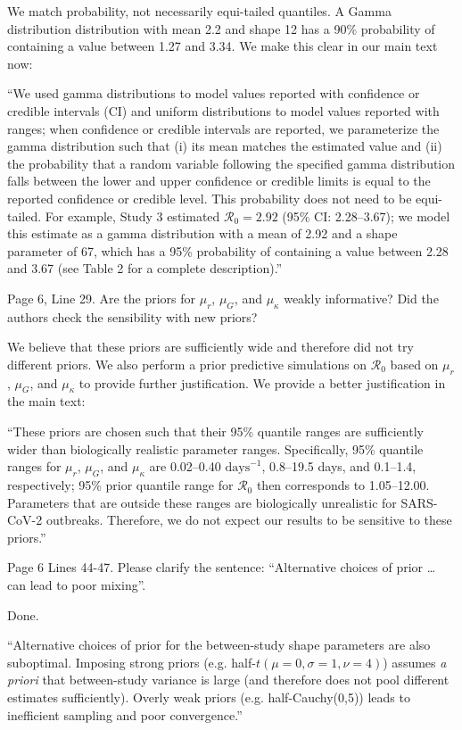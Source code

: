 \documentclass[12pt]{article}
\newcommand{\Ro}{\ensuremath{{\mathcal R}_{0}}\xspace}
\newcommand{\revtext}{\textsf}
\begin{document}
We match probability, not necessarily equi-tailed quantiles. A Gamma distribution distribution with mean
2.2 and shape 12 has a 90\% probability of containing a value between 1.27 and 3.34. We make this clear in our main text now:

``We used gamma distributions to model values reported with confidence or credible intervals (CI) and uniform distributions to model values reported with ranges;
when confidence or credible intervals are reported, we parameterize the gamma distribution such that (i) its mean matches the estimated value and (ii) the probability that a random variable following the specified gamma distribution falls between the lower and upper confidence or credible limits is equal to the reported confidence or credible level. 
This probability does not need to be equi-tailed.
For example, Study 3 estimated $\Ro = 2.92$ (95\% CI: 2.28--3.67);
we model this estimate as a gamma distribution with a mean of 2.92 and a shape parameter of 67, which has a 95\% probability of containing a value between 2.28 and 3.67 (see Table 2 for a complete description).''

\revtext{Page 6, Line 29. Are the priors for $\mu_r$, $\mu_G$, and $\mu_\kappa$ weakly informative? Did the
authors check the sensibility with new priors?}

We believe that these priors are sufficiently wide and therefore did not try different priors.
We also perform a prior predictive simulations on \Ro based on $\mu_r$, $\mu_G$, and $\mu_\kappa$ to provide further justification.
We provide a better justification in the main text:

``These priors are chosen such that their 95\% quantile ranges are sufficiently wider than biologically realistic parameter ranges.
Specifically, 95\% quantile ranges for $\mu_r$, $\mu_G$, and $\mu_\kappa$ are 0.02--0.40 $\mathrm{days}^{-1}$, 0.8--19.5 days, and 0.1--1.4, respectively;
95\% prior quantile range for \Ro then corresponds to 1.05--12.00.
Parameters that are outside these ranges are biologically unrealistic for SARS-CoV-2 outbreaks.
Therefore, we do not expect our results to be sensitive to these priors.''

\revtext{Page 6 Lines 44-47. Please clarify the sentence: “Alternative choices of prior … can lead to
poor mixing”.}

Done.

``Alternative choices of prior for the between-study shape parameters are also suboptimal. 
Imposing strong priors (e.g. half-$t(\mu=0,\sigma=1,\nu=4)$) assumes \textit{a priori} that between-study variance is large (and therefore does not pool different estimates sufficiently).
Overly weak priors (e.g. half-Cauchy(0,5)) leads to inefficient sampling and poor convergence.''
\end{document}
